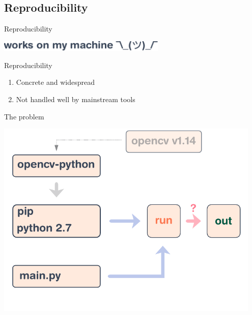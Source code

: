 \documentclass[t, aspectratio=169]{beamer}
\begin{document}
\subsection{Reproducibility}

\begin{frame}{Reproducibility}
    \begin{center}
        \includegraphics[width=0.6\textwidth]{img/works-on-my-machine.pdf}
    \end{center}

    \vspace{10pt}

     {
    \begin{alertblock}{Reproducibility}
    \begin{enumerate}
        \item<3-> Concrete and widespread
        \item<4-> Not handled well by mainstream tools
    \end{enumerate}
    \end{alertblock}
}
\end{frame}

\begin{frame}{The problem}
    \begin{center}
        \includegraphics[width=0.95\textwidth]{img/schema-build.pdf}
    \end{center}
\end{frame}
\end{document}
